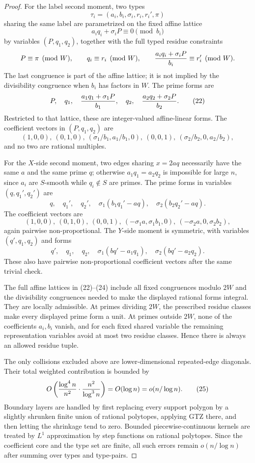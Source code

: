 \documentclass[11pt]{article}
\begin{document}
\begin{proof}
For the label second moment, two types
\[
  \tau_i=(a_i,b_i,\sigma_i,r_i,r_i',\pi)
\]
sharing the same label are parametrized on the fixed affine lattice
\[
  a_iq_i+\sigma_iP\equiv0\pmod {b_i}
\]
by variables $(P,q_1,q_2)$, together with the full typed residue constraints
\[
  P\equiv\pi\pmod W,\qquad
  q_i\equiv r_i\pmod W,\qquad
  {a_iq_i+\sigma_iP\over b_i}\equiv r_i'\pmod W.
\]
The last congruence is part of the affine lattice; it is not implied by the
divisibility congruence when $b_i$ has factors in $W$.  The prime forms are
\[
  P,
  \quad q_1,
  \quad {a_1q_1+\sigma_1P\over b_1},
  \quad q_2,
  \quad {a_2q_2+\sigma_2P\over b_2}.                    \tag{22}
\]
Restricted to that lattice, these are integer-valued affine-linear forms.  The
coefficient vectors in $(P,q_1,q_2)$ are
\[
  (1,0,0),\ (0,1,0),\ (\sigma_1/b_1,a_1/b_1,0),\
  (0,0,1),\ (\sigma_2/b_2,0,a_2/b_2),
\]
and no two are rational multiples.

For the $X$-side second moment, two edges sharing $x=2aq$ necessarily have the
same $a$ and the same prime $q$; otherwise $a_1q_1=a_2q_2$ is impossible for
large $n$, since $a_i$ are $S$-smooth while $q_i\notin S$ are primes.  The prime
forms in variables $(q,q_1',q_2')$ are
\[
  q,
  \quad q_1',
  \quad q_2',
  \quad \sigma_1(b_1q_1'-aq),
  \quad \sigma_2(b_2q_2'-aq).                            \tag{23}
\]
The coefficient vectors are
\[
  (1,0,0),\ (0,1,0),\ (0,0,1),\
  (-\sigma_1a,\sigma_1b_1,0),\
  (-\sigma_2a,0,\sigma_2b_2),
\]
again pairwise non-proportional.  The $Y$-side moment is symmetric, with
variables $(q',q_1,q_2)$ and forms
\[
  q',
  \quad q_1,
  \quad q_2,
  \quad \sigma_1(bq'-a_1q_1),
  \quad \sigma_2(bq'-a_2q_2).                            \tag{24}
\]
These also have pairwise non-proportional coefficient vectors after the same
trivial check.

The full affine lattices in (22)--(24) include all fixed congruences modulo
$2W$ and the divisibility congruences needed to make the displayed rational
forms integral.  They are locally admissible.  At primes dividing $2W$, the
prescribed residue classes make every displayed prime form a unit.  At primes
outside $2W$, none of the coefficients $a_i,b_i$ vanish, and for each fixed
shared variable the remaining representation variables avoid at most two
residue classes.  Hence there is always an allowed residue tuple.

The only collisions excluded above are lower-dimensional repeated-edge
diagonals.  Their total weighted contribution is bounded by
\[
  O\left({\log^4 n\over n^2}\cdot {n^2\over\log^3 n}\right)
  =O(\log n)=o(n/\log n).                                \tag{25}
\]
Boundary layers are handled by first replacing every support polygon by a
slightly shrunken finite union of rational polytopes, applying GTZ there, and
then letting the shrinkage tend to zero.  Bounded piecewise-continuous kernels
are treated by $L^1$ approximation by step functions on rational polytopes.
Since the coefficient core and the type set are finite, all such errors remain
$o(n/\log n)$ after summing over types and type-pairs.


\end{proof}
\end{document}
